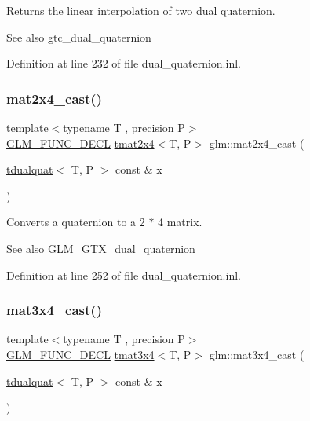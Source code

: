 Returns the linear interpolation of two dual quaternion.

\begin{DoxySeeAlso}{See also}
gtc\+\_\+dual\+\_\+quaternion 
\end{DoxySeeAlso}


Definition at line 232 of file dual\+\_\+quaternion.\+inl.

\mbox{\label{group__gtx__dual__quaternion_ga2d124748183e12db8288eeaca350298e}} 
\subsubsection{\texorpdfstring{mat2x4\_cast()}{mat2x4\_cast()}}
{\footnotesize\ttfamily template$<$typename T , precision P$>$ \\
\mbox{\hyperlink{setup_8hpp_ab2d052de21a70539923e9bcbf6e83a51}{G\+L\+M\+\_\+\+F\+U\+N\+C\+\_\+\+D\+E\+CL}} \mbox{\hyperlink{structglm_1_1tmat2x4}{tmat2x4}}$<$T, P$>$ glm\+::mat2x4\+\_\+cast (\begin{DoxyParamCaption}\item[{\mbox{\hyperlink{structglm_1_1tdualquat}{tdualquat}}$<$ T, P $>$ const \&}]{x }\end{DoxyParamCaption})}

Converts a quaternion to a 2 $\ast$ 4 matrix.

\begin{DoxySeeAlso}{See also}
\mbox{\hyperlink{group__gtx__dual__quaternion}{G\+L\+M\+\_\+\+G\+T\+X\+\_\+dual\+\_\+quaternion}} 
\end{DoxySeeAlso}


Definition at line 252 of file dual\+\_\+quaternion.\+inl.

\mbox{\label{group__gtx__dual__quaternion_ga576745d979e3c079a64152490c816954}} 
\subsubsection{\texorpdfstring{mat3x4\_cast()}{mat3x4\_cast()}}
{\footnotesize\ttfamily template$<$typename T , precision P$>$ \\
\mbox{\hyperlink{setup_8hpp_ab2d052de21a70539923e9bcbf6e83a51}{G\+L\+M\+\_\+\+F\+U\+N\+C\+\_\+\+D\+E\+CL}} \mbox{\hyperlink{structglm_1_1tmat3x4}{tmat3x4}}$<$T, P$>$ glm\+::mat3x4\+\_\+cast (\begin{DoxyParamCaption}\item[{\mbox{\hyperlink{structglm_1_1tdualquat}{tdualquat}}$<$ T, P $>$ const \&}]{x }\end{DoxyParamCaption})}


